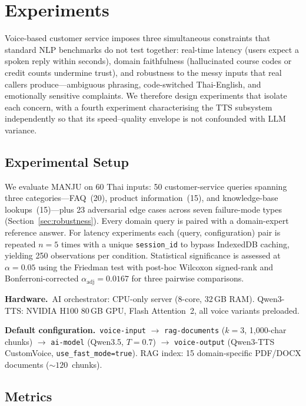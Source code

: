 \documentclass[10pt, a4paper, twocolumn]{article}
\begin{document}
\section{Experiments}
\label{sec:experiments}

Voice-based customer service imposes three simultaneous constraints that
standard NLP benchmarks do not test together: real-time latency
(users expect a spoken reply within seconds), domain faithfulness
(hallucinated course codes or credit counts undermine trust), and
robustness to the messy inputs that real callers produce---ambiguous
phrasing, code-switched Thai-English, and emotionally sensitive
complaints.
We therefore design experiments that isolate each concern, with a
fourth experiment characterising the TTS subsystem independently so
that its speed--quality envelope is not confounded with LLM variance.

\subsection{Experimental Setup}
\label{sec:setup}

We evaluate MANJU on 60 Thai inputs: 50 customer-service queries
spanning three categories---FAQ~(20), product information~(15), and
knowledge-base lookups~(15)---plus 23 adversarial edge cases across
seven failure-mode types (Section~\ref{sec:robustness}).
Every domain query is paired with a domain-expert reference answer.
For latency experiments each (query, configuration) pair is repeated
$n{=}5$ times with a unique \texttt{session\_id} to bypass IndexedDB
caching, yielding 250 observations per condition.
Statistical significance is assessed at $\alpha{=}0.05$ using the
Friedman test with post-hoc Wilcoxon signed-rank and Bonferroni-corrected
$\alpha_\text{adj}{=}0.0167$ for three pairwise comparisons.

\noindent\textbf{Hardware.}\ AI orchestrator: CPU-only server
(8-core, 32\,GB RAM).
Qwen3-TTS: NVIDIA H100 80\,GB GPU, Flash Attention~2, all voice
variants preloaded.

\noindent\textbf{Default configuration.}\
\texttt{voice-input} $\rightarrow$ \texttt{rag-documents}
($k{=}3$, 1{,}000-char chunks) $\rightarrow$ \texttt{ai-model}
(Qwen3.5, $T{=}0.7$) $\rightarrow$ \texttt{voice-output}
(Qwen3-TTS CustomVoice, \texttt{use\_fast\_mode=true}).
RAG index: 15 domain-specific PDF/DOCX documents (${\sim}120$~chunks).

\subsection{Metrics}
\label{sec:metrics}
\end{document}
